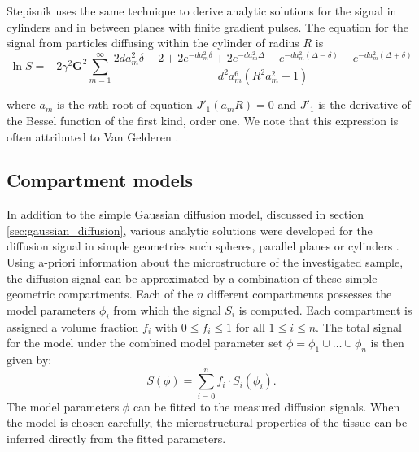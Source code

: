 Stepisnik \cite{stepisnik1993time} uses the same technique to derive analytic solutions for the signal  in cylinders and in between planes with finite gradient pulses. The equation for the signal from particles diffusing within the cylinder of radius $R$ is
\begin{equation}
\ln S = -2\gamma^{2}\textbf{G}^{2}\sum_{m=1}^{\infty}\frac{2da_{m}^{2}\delta-2+2e^{-da_{m}^{2}\delta}+2e^{-da_{m}^{2}\Delta}- e^{-da_{m}^{2}(\Delta-\delta)} -e^{-da_{m}^{2}(\Delta+\delta)}}{d^{2}a_{m}^{6}(R^{2}a_{m}^{2}- 1)}
\label{biganal}
\end{equation}

where  $a_{m}$ is the $m$th root of equation  $J'_{1}(a_{m}R)= 0$ and $J'_{1}$ is the derivative of the Bessel function of the first kind, order one.
We  note that this expression is often attributed to Van Gelderen \cite{Gelderen}.

\subsection{Compartment models}
\label{sec:multicompartment_modeling}
In addition to the simple Gaussian diffusion model, discussed in section \ref{sec:gaussian_diffusion}, various analytic solutions were developed for the diffusion signal in simple geometries such spheres, parallel planes \citep{Balinov:1993, Linse:1995, Callaghan:1996} or cylinders \citep{Gelderen:1994}. Using a-priori information about the microstructure of the investigated sample, the diffusion signal can be approximated by a combination of these simple geometric compartments. Each of the $n$ different compartments possesses the model parameters $\phi_{i}$ from which the signal $S_i$ is computed. Each compartment is assigned a volume fraction $f_i$ with $0 \le f_i \le 1$ for all $1 \le i \le n$. The total signal for the model under the combined model parameter set $\phi=\phi_{1}\cup\dots\cup\phi_{n}$ is then given by:
\begin{equation}
	S(\phi)=\sum_{i=0}^{n}f_i\cdot S_i(\phi_i).
\end{equation}
The model parameters $\phi$ can be fitted to the measured diffusion signals. When the model is chosen carefully, the microstructural properties of the tissue  can be inferred directly from the fitted parameters.


